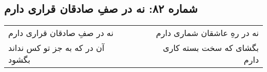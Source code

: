 \begin{center}
\section*{شماره ۸۲: نه در صفِ صادقان قراری دارم}
\label{sec:082}
\begin{longtable}{l p{0.5cm} r}
نه در صفِ صادقان قراری دارم
&&
نه در رهِ عاشقان شماری دارم
\\
آن در که به جز تو کس نداند بگشود
&&
بگشای که سخت بسته کاری دارم
\\
\end{longtable}
\end{center}

